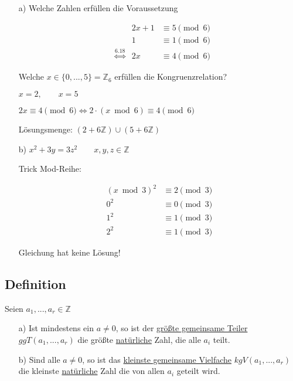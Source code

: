 \documentclass[a4paper, 12pt, twoside] {article}
\begin{document}
\begin{itemize}
\item[a)] Welche Zahlen erfüllen die Voraussetzung

\begin{align*}
&										&	2x + 1 &\equiv 5 \pmod 6 \\
&										&	      1 &\equiv 1 \pmod 6 \\
&\overset{\text{6.18}}{\Leftrightarrow}	&	     2x &\equiv 4 \pmod 6
\end{align*}

Welche $x \in \{0,...,5\} = \mathbb{Z}_6$ erfüllen die Kongruenzrelation?

$x=2, \qquad x=5$

$2x \equiv 4 \pmod 6 \Leftrightarrow 2 \cdot (x \bmod 6) \equiv 4 \pmod 6$

Lösungsmenge: $(2+6\mathbb{Z}) \cup (5+6\mathbb{Z})$		

\item[b)] $x^2 + 3y = 3z^2 \qquad x,y,z \in \mathbb{Z}$

Trick Mod-Reihe:

\begin{align*}
	(x \bmod 3)^2 &\equiv 2 \pmod 3 \\
	0^2 &\equiv 0  \pmod 3 \\
	1^2 &\equiv 1 \pmod 3 \\
	2^2 &\equiv 1 \pmod 3
\end{align*}
	
Gleichung hat keine Lösung!

\end{itemize}

\subsection{Definition} %

Seien $a_1, ..., a_r \in \mathbb{Z}$

\begin{itemize}
\item[a)] Ist mindestens ein $a \neq 0$, so ist der \underline{größte gemeinsame Teiler} $ggT(a_1, ..., a_r)$ die größte \underline{natürliche} Zahl, die alle $a_i$ teilt.

\item[b)] Sind alle $a \neq 0$, so ist das \underline{kleinste gemeinsame Vielfache} $kgV(a_1,..., a_r)$ die kleinste \underline{natürliche} Zahl die von allen $a_i$ geteilt wird.

\end{itemize}
\end{document}
